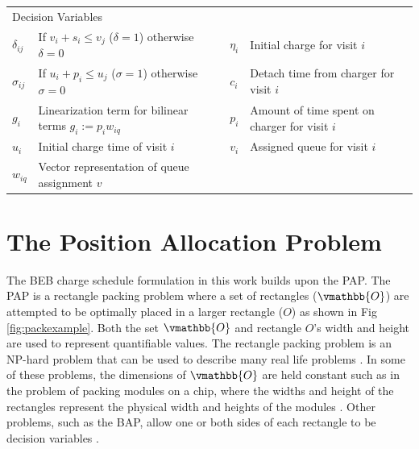 \documentclass[letterpaper, 10pt, conference]{IEEEtran}
\begin{document}
\begin{table}[!t]
\begin{tabular}{l l l l}
		\hline
		\multicolumn{4}{l}{Decision Variables} \\
			$\delta_{ij}$ & If $v_i + s_i \leq v_j$ (\(\delta = 1\)) otherwise \(\delta = 0\)   &
			$\eta_i$      & Initial charge for visit $i$                                        \\
			$\sigma_{ij}$ & If \(u_i + p_i \leq u_j\) (\(\sigma = 1\)) otherwise \(\sigma = 0\) &
			$c_i$         & Detach time from charger for visit $i$                              \\
			$g_i$         & Linearization term for bilinear terms $g_i := p_i w_{iq}$           &
			$p_i$         & Amount of time spent on charger for visit $i$                       \\
			$u_i$         & Initial charge time of visit $i$                                    &
			$v_i$         & Assigned queue for visit $i$                                        \\
			$w_{iq}$      & Vector representation of queue assignment \(v\)                     \\
			\bottomrule
	\end{tabular}
\end{table}

\section{The Position Allocation Problem}
\label{sec:positionallocationproblem}
The BEB charge schedule formulation in this work builds upon the PAP. The PAP is a rectangle packing problem where a set of rectangles (\(\vmathbb{O}\)) are attempted to be optimally placed in a larger rectangle (\(O\)) as shown in Fig \ref{fig:packexample}. Both the set \(\vmathbb{O}\) and rectangle \(O\)'s width and height are used to represent quantifiable values. The rectangle packing problem is an NP-hard problem that can be used to describe many real life problems \cite{Bruin2013,Murata1995}. In some of these problems, the dimensions of \(\vmathbb{O}\) are held constant such as in the problem of packing modules on a chip, where the widths and height of the rectangles represent the physical width and heights of the modules \cite{Murata1995}. Other problems, such as the BAP, allow one or both sides of each rectangle to be decision variables \cite{Buhrkal2010}.

\end{document}
